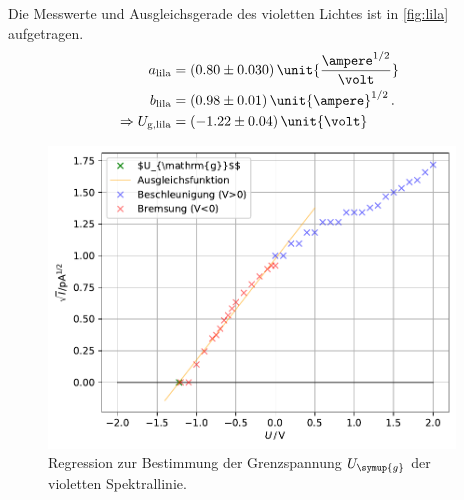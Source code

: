 Die Messwerte und Ausgleichsgerade des violetten Lichtes ist in \autoref{fig:lila} aufgetragen.
\begin{align*}
    a_{\text{lila}}&=(0.80\pm 0.030) \, \unit{\frac{\ampere ^{1/2}}{\volt}}\\
    b_{\text{lila}}&=(0.98\pm 0.01) \, \unit{\ampere}^{1/2}\, .\\
    \Rightarrow U_{\text{g,lila}}&=(-1.22\pm 0.04)\, \unit{\volt}\\
\end{align*}

\begin{figure}
    \centering
    \includegraphics[height = 8cm]{build/plotlila.pdf}
    \caption{Regression zur Bestimmung der Grenzspannung $U_{\symup{g}}$ der violetten Spektrallinie.}
    \label{fig:lila}
\end{figure}

\newpage




